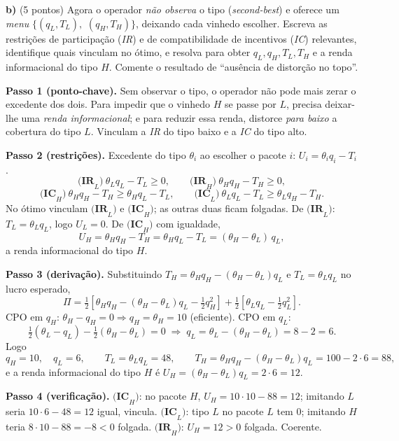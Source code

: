 \textbf{b)} (5 pontos) Agora o operador \emph{n\~ao observa} o tipo (\emph{second-best}) e oferece um \emph{menu} $\{(q_L,T_L),$ $(q_H,T_H)\}$, deixando cada vinhedo escolher. Escreva as restri\c{c}\~oes de participa\c{c}\~ao (\emph{IR}) e de compatibilidade de incentivos (\emph{IC}) relevantes, identifique quais vinculam no \'otimo, e resolva para obter $q_L, q_H, T_L, T_H$ e a renda informacional do tipo $H$. Comente o resultado de ``aus\^encia de distor\c{c}\~ao no topo''.
\resolucaobox{7.2cm}
\begin{solucao}
\textbf{Passo 1 (ponto-chave).} Sem observar o tipo, o operador n\~ao pode mais zerar o excedente dos dois. Para impedir que o vinhedo $H$ se passe por $L$, precisa deixar-lhe uma \emph{renda informacional}; e para reduzir essa renda, distorce \emph{para baixo} a cobertura do tipo $L$. Vinculam a \emph{IR} do tipo baixo e a \emph{IC} do tipo alto.

\textbf{Passo 2 (restri\c{c}\~oes).} Excedente do tipo $\theta_i$ ao escolher o pacote $i$: $U_i = \theta_i q_i - T_i$.
\[
\textbf{(IR}_L\textbf{)}\ \theta_L q_L - T_L \ge 0,\qquad \textbf{(IR}_H\textbf{)}\ \theta_H q_H - T_H \ge 0,
\]
\[
\textbf{(IC}_H\textbf{)}\ \theta_H q_H - T_H \ge \theta_H q_L - T_L,\qquad \textbf{(IC}_L\textbf{)}\ \theta_L q_L - T_L \ge \theta_L q_H - T_H.
\]
No \'otimo vinculam $\textbf{(IR}_L\textbf{)}$ e $\textbf{(IC}_H\textbf{)}$; as outras duas ficam folgadas. De $\textbf{(IR}_L\textbf{)}$: $T_L = \theta_L q_L$, logo $U_L = 0$. De $\textbf{(IC}_H\textbf{)}$ com igualdade,
\[
U_H = \theta_H q_H - T_H = \theta_H q_L - T_L = (\theta_H - \theta_L)\,q_L,
\]
a renda informacional do tipo $H$.

\textbf{Passo 3 (deriva\c{c}\~ao).} Substituindo $T_H = \theta_H q_H - (\theta_H - \theta_L)q_L$ e $T_L = \theta_L q_L$ no lucro esperado,
\[
\Pi = \tfrac{1}{2}\!\left[\theta_H q_H - (\theta_H-\theta_L)q_L - \tfrac{1}{2}q_H^{2}\right] + \tfrac{1}{2}\!\left[\theta_L q_L - \tfrac{1}{2}q_L^{2}\right].
\]
CPO em $q_H$: $\theta_H - q_H = 0 \Rightarrow q_H = \theta_H = 10$ (eficiente). CPO em $q_L$:
\[
\tfrac{1}{2}(\theta_L - q_L) - \tfrac{1}{2}(\theta_H - \theta_L) = 0 \;\Longrightarrow\; q_L = \theta_L - (\theta_H - \theta_L) = 8 - 2 = 6.
\]
Logo
\[
q_H = 10,\quad q_L = 6,\qquad T_L = \theta_L q_L = 48,\qquad T_H = \theta_H q_H - (\theta_H-\theta_L)q_L = 100 - 2\cdot 6 = 88,
\]
e a renda informacional do tipo $H$ \'e $U_H = (\theta_H - \theta_L)q_L = 2\cdot 6 = 12$.

\textbf{Passo 4 (verifica\c{c}\~ao).} $\textbf{(IC}_H\textbf{)}$: no pacote $H$, $U_H = 10\cdot 10 - 88 = 12$; imitando $L$ seria $10\cdot 6 - 48 = 12$ \textemdash{} igual, vincula. $\textbf{(IC}_L\textbf{)}$: tipo $L$ no pacote $L$ tem $0$; imitando $H$ teria $8\cdot 10 - 88 = -8 < 0$ \textemdash{} folgada. $\textbf{(IR}_H\textbf{)}$: $U_H = 12 > 0$ \textemdash{} folgada. Coerente.


\end{solucao}
